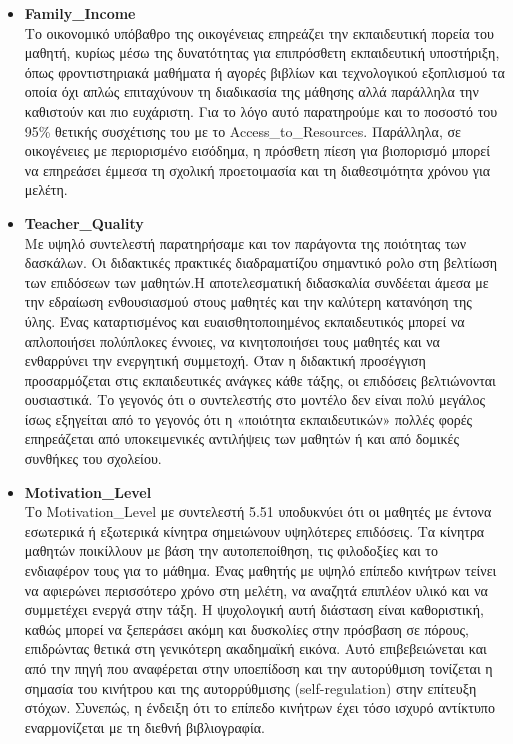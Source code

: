 \documentclass[12pt]{article}
\begin{document}
\begin{itemize}
\item \textbf{Family\_{Income}}\\
Το οικονομικό υπόβαθρο της οικογένειας επηρεάζει την εκπαιδευτική πορεία του μαθητή, κυρίως μέσω της δυνατότητας 
για επιπρόσθετη εκπαιδευτική υποστήριξη, όπως φροντιστηριακά μαθήματα ή αγορές βιβλίων και τεχνολογικού εξοπλισμού τα οποία όχι απλώς 
επιταχύνουν τη διαδικασία της μάθησης αλλά παράλληλα την καθιστούν και πιο ευχάριστη. 
Για το λόγο αυτό παρατηρούμε και το ποσοστό του 95\%  θετικής συσχέτισης του με το Access\_{to}\_{Resources}.
Παράλληλα, σε οικογένειες με περιορισμένο εισόδημα, η πρόσθετη πίεση για βιοπορισμό μπορεί να επηρεάσει έμμεσα τη σχολική προετοιμασία και τη διαθεσιμότητα χρόνου για μελέτη.

\item \textbf{Teacher\_{Quality}}\\
Με υψηλό συντελεστή παρατηρήσαμε και τον παράγοντα της ποιότητας των δασκάλων. Οι διδακτικές πρακτικές διαδραματίζου σημαντικό ρολο στη βελτίωση
των επιδόσεων των μαθητών.Η αποτελεσματική διδασκαλία συνδέεται άμεσα με την εδραίωση ενθουσιασμού στους μαθητές και την καλύτερη κατανόηση της ύλης. Ένας καταρτισμένος 
και ευαισθητοποιημένος εκπαιδευτικός μπορεί να απλοποιήσει πολύπλοκες έννοιες, να κινητοποιήσει τους μαθητές και να ενθαρρύνει την ενεργητική συμμετοχή. Όταν η διδακτική
προσέγγιση προσαρμόζεται στις εκπαιδευτικές ανάγκες κάθε τάξης, οι επιδόσεις βελτιώνονται ουσιαστικά. Το γεγονός ότι ο συντελεστής στο μοντέλο δεν είναι πολύ μεγάλος ίσως 
εξηγείται από το γεγονός ότι η «ποιότητα εκπαιδευτικών» πολλές φορές επηρεάζεται από υποκειμενικές αντιλήψεις των μαθητών ή και από δομικές συνθήκες του σχολείου.

\item \textbf{Motivation\_{Level}}\\
Το Motivation\_{Level} με συντελεστή 5.51 υποδυκνύει ότι οι μαθητές με έντονα εσωτερικά ή εξωτερικά κίνητρα σημειώνουν υψηλότερες επιδόσεις. Τα κίνητρα μαθητών ποικίλλουν με 
βάση την αυτοπεποίθηση, τις φιλοδοξίες και το ενδιαφέρον τους για το μάθημα. Ένας μαθητής με υψηλό επίπεδο κινήτρων τείνει να αφιερώνει περισσότερο χρόνο στη μελέτη, να 
αναζητά επιπλέον υλικό και να συμμετέχει ενεργά στην τάξη. Η ψυχολογική αυτή διάσταση είναι καθοριστική, καθώς μπορεί να ξεπεράσει ακόμη και δυσκολίες στην πρόσβαση σε 
πόρους, επιδρώντας θετικά στη γενικότερη ακαδημαϊκή εικόνα. Αυτό επιβεβειώνεται και από την πηγή που αναφέρεται στην υποεπίδοση και την αυτορύθμιση  τονίζεται η σημασία 
του κινήτρου και της αυτορρύθμισης (self-regulation) στην επίτευξη στόχων. Συνεπώς, η ένδειξη ότι το επίπεδο κινήτρων έχει τόσο ισχυρό αντίκτυπο εναρμονίζεται με τη διεθνή βιβλιογραφία.


\end{itemize}
\end{document}
